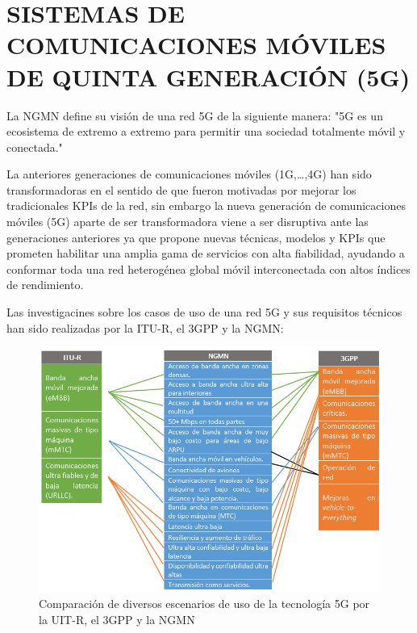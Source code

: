 \section{SISTEMAS DE COMUNICACIONES MÓVILES DE QUINTA GENERACIÓN (5G)}

La NGMN define su visión de una red 5G de la siguiente manera: "5G es un ecosistema de extremo a extremo para permitir una sociedad totalmente móvil y conectada."\newline

La anteriores generaciones de comunicaciones móviles (1G,{\dots},4G) han sido transformadoras en el sentido de que fueron motivadas por mejorar los tradicionales KPIs de la red, sin embargo la nueva generación de comunicaciones móviles (5G) aparte de ser transformadora viene a ser disruptiva ante las generaciones anteriores ya que propone nuevas técnicas, modelos y KPIs que prometen habilitar una amplia gama de servicios con alta fiabilidad, ayudando a conformar toda una red heterogénea global móvil interconectada con altos índices de rendimiento.\newline

Las investigacines sobre los casos de uso de una red 5G y sus requisitos técnicos han sido realizadas por la ITU-R, el 3GPP y la NGMN:

\begin{figure}[th]
\centering
\includegraphics[scale=1]{Figures/Comparación de diversos escenarios de uso de la tecnología 5G}
\decoRule
\caption[Comparación de diversos escenarios de uso de la tecnología 5G por la UIT-R, el 3GPP y la NGMN]{Comparación de diversos escenarios de uso de la tecnología 5G por la UIT-R, el 3GPP y la NGMN}
\label{fig:5g}
\end{figure}

